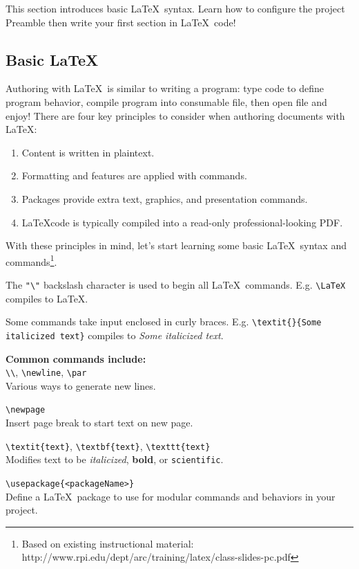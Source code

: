 This section introduces basic \LaTeX\ syntax. Learn how to configure the project Preamble then write your first section in \LaTeX\ code!
\subsection{Basic LaTeX}
Authoring with \LaTeX\ is similar to writing a program: type code to define program behavior, compile program into consumable file, then open file and enjoy! There are four key principles to consider when authoring documents with \LaTeX:
\begin{enumerate}
    \item Content is written in plaintext.
    \item Formatting and features are applied with commands.
    \item Packages provide extra text, graphics, and presentation commands.
    \item \LaTeX code is typically compiled into a read-only professional-looking PDF.
\end{enumerate}
With these principles in mind, let's start learning some basic \LaTeX\ syntax and commands\footnote{Based on existing instructional material: http://www.rpi.edu/dept/arc/training/latex/class-slides-pc.pdf}.
\par
The \verb|"\"| backslash character is used to begin all \LaTeX\ commands. E.g.
\verb|\LaTeX| compiles to \LaTeX.
\par
Some commands take input enclosed in curly braces. E.g.
\verb|\textit{}{Some italicized text}| compiles to \textit{Some italicized text}.
\par
{\Large\textbf{Common commands include:}\\}
\verb|\\|, \verb|\newline|, \verb|\par|\\
Various ways to generate new lines.
\par
\verb|\newpage|\\
Insert page break to start text on new page.
\par
\verb|\textit{text}|, \verb|\textbf{text}|, \verb|\texttt{text}|\\
Modifies text to be \textit{italicized}, \textbf{bold}, or \texttt{scientific}.
\par
\verb|\usepackage{<packageName>}|\\
Define a \LaTeX\ package to use for modular commands and behaviors in your project.
